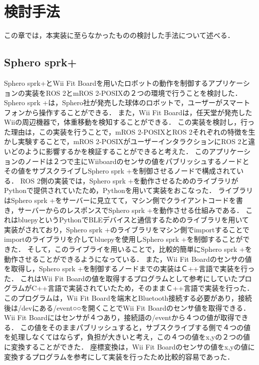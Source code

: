 \chapter{検討手法}
この章では，本実装に至らなかったものの検討した手法について述べる．
\section{Sphero sprk+}
Sphero sprk+とWii Fit Boardを用いたロボットの動作を制御するアプリケーションの実装をROS 2とmROS 2-POSIXの２つの環境で行うことを検討した．
Sphero sprk +は，Sphero社が発売した球体のロボットで，ユーザーがスマートフォンから操作することができる．
また，Wii Fit Boardは，任天堂が発売したWiiの周辺機器で，体重移動を検知することができる．
この実装を検討し，行った理由は，この実装を行うことで，mROS 2-POSIXとROS 2それぞれの特徴を生かし実験することで，mROS 2-POSIXがユーザーインタラクションにROS 2と違いどのように影響するかを検証することができると考えた．
このアプリケーションのノードは２つで主にWiiboardのセンサの値をパブリッシュするノードとその値をサブスクライブしSphero sprk +を制御させるノードで構成されている．
ROS 2側の実装では，Sphero sprk +を動作させるためのライブラリがPythonで提供されていたため，Pythonを用いて実装をおこなった．
ライブラリはSphero sprk +をサーバーに見立てて，マシン側でクライアントコードを書き，サーバーからのレスポンスでSphero sprk +を動作させる仕組みである．
これはbluepyというPythonでBLEデバイスと通信するためのライブラリを用いて実装がされており，Sphero sprk +のライブラリをマシン側でimportすることでimportのライブラリを介してbluepyを使用しSphero sprk +を制御することができた．
そして，このライブライを用いることで，比較的簡単にSphero sprk +を動作させることができるようになっている．
また，Wii Fit Boardのセンサの値を取得し，Sphero sprk +を制御するノードまでの実装はＣ++言語で実装を行った．
これはWii Fit Boardの値を取得するプログラムとして参考にしていたプログラムがC++言語で実装されていたため，そのままＣ++言語で実装を行った．
このプログラムは，Wii Fit Boardを端末とBluetooth接続する必要があり，接続後は/devにある/event○○を開くことでWii Fit Boardのセンサ値を取得できる．
Wii Fit Boardにはセンサが４つあり，接続語の/eventから４つの値が取得できる．
この値をそのままパブリッシュすると，サブスクライブする側で４つの値を処理しなくてはならず，負担が大きいと考え，この４つの値をx,yの２つの値に変換することができた．
座標変換は，Wii Fit Boardのセンサの値をx,yの値に変換するプログラムを参考にして実装を行ったため比較的容易であった．
